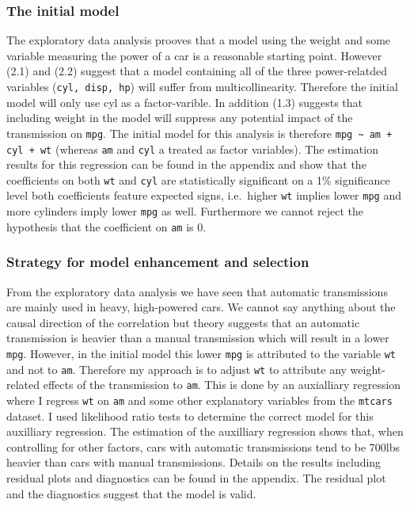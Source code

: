 \documentclass[5pt,]{article}
\begin{document}
\subsubsection{The initial model}\label{the-initial-model}

The exploratory data analysis prooves that a model using the weight and
some variable measuring the power of a car is a reasonable starting
point. However (2.1) and (2.2) suggest that a model containing all of
the three power-relatded variables (\texttt{cyl, disp, hp}) will suffer
from multicollinearity. Therefore the initial model will only use cyl as
a factor-varible. In addition (1.3) suggests that including weight in
the model will suppress any potential impact of the transmission on
\texttt{mpg}. The initial model for this analysis is therefore
\texttt{mpg \textasciitilde{} am + cyl + wt} (whereas \texttt{am} and
\texttt{cyl} a treated as factor variables). The estimation results for
this regression can be found in the appendix and show that the
coefficients on both \texttt{wt} and \texttt{cyl} are statistically
significant on a 1\% significance level both coefficients feature
expected signs, i.e.~higher \texttt{wt} implies lower \texttt{mpg} and
more cylinders imply lower \texttt{mpg} as well. Furthermore we cannot
reject the hypothesis that the coefficient on \texttt{am} is 0.

\subsubsection{Strategy for model enhancement and
selection}\label{strategy-for-model-enhancement-and-selection}

From the exploratory data analysis we have seen that automatic
transmissions are mainly used in heavy, high-powered cars. We cannot say
anything about the causal direction of the correlation but theory
suggests that an automatic transmission is heavier than a manual
transmission which will result in a lower \texttt{mpg}. However, in the
initial model this lower \texttt{mpg} is attributed to the variable
\texttt{wt} and not to \texttt{am}. Therefore my approach is to adjust
\texttt{wt} to attribute any weight-related effects of the transmission
to \texttt{am}. This is done by an auxialliary regression where I
regress \texttt{wt} on \texttt{am} and some other explanatory variables
from the \texttt{mtcars} dataset. I used likelihood ratio tests to
determine the correct model for this auxilliary regression. The
estimation of the auxilliary regression shows that, when controlling for
other factors, cars with automatic transmissions tend to be 700lbs
heavier than cars with manual transmissions. Details on the results
including residual plots and diagnostics can be found in the appendix.
The residual plot and the diagnostics suggest that the model is valid.
\end{document}
